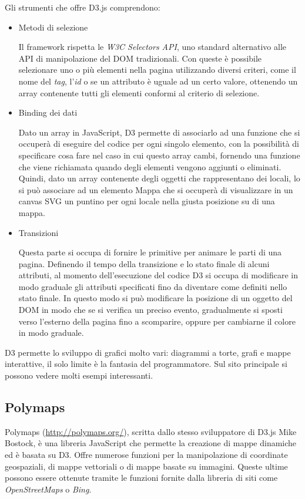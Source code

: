 Gli strumenti che offre D3.js comprendono:
\begin{itemize}
\item Metodi di selezione

Il framework rispetta le \emph{W3C Selectors API}, uno standard alternativo alle API di manipolazione del DOM tradizionali. Con queste è possibile selezionare uno o più elementi nella pagina utilizzando diversi criteri, come il nome del \emph{tag}, l'\emph{id} o se un attributo è uguale ad un certo valore, ottenendo un array contenente tutti gli elementi conformi al criterio di selezione.

\item Binding dei dati

Dato un array in JavaScript, D3 permette di associarlo ad una funzione che si occuperà di eseguire del codice per ogni singolo elemento, con la possibilità di specificare cosa fare nel caso in cui questo array cambi, fornendo una funzione che viene richiamata quando degli elementi vengono aggiunti o eliminati. Quindi, dato un array contenente degli oggetti che rappresentano dei locali, lo si può associare ad un elemento Mappa che si occuperà di visualizzare in un canvas SVG un puntino per ogni locale nella giusta posizione su di una mappa.

\item Transizioni

Questa parte si occupa di fornire le primitive per animare le parti di una pagina. Definendo il tempo della transizione e lo stato finale di alcuni attributi, al momento dell'esecuzione del codice D3 si occupa di modificare in modo graduale gli attributi specificati fino da diventare come definiti nello stato finale. In questo modo si può modificare la posizione di un oggetto del DOM in modo che se si verifica un preciso evento, gradualmente si sposti verso l'esterno della pagina fino a scomparire, oppure per cambiarne il colore in modo graduale.
\end{itemize}

D3 permette lo sviluppo di grafici molto vari: diagrammi a torte, grafi e mappe interattive, il solo limite è la fantasia del programmatore. Sul sito principale si possono vedere molti esempi interessanti.
		
\subsection{Polymaps}\label{sec:polymaps}
Polymaps (\url{http://polymaps.org/}), scritta dallo stesso sviluppatore di D3.js Mike Bostock, è una libreria JavaScript che permette la creazione di mappe dinamiche ed è basata su D3. Offre numerose funzioni per la manipolazione di coordinate geospaziali, di mappe vettoriali o di mappe basate su immagini. Queste ultime possono essere ottenute tramite le funzioni fornite dalla libreria di siti come \emph{OpenStreetMaps} o \emph{Bing}.



